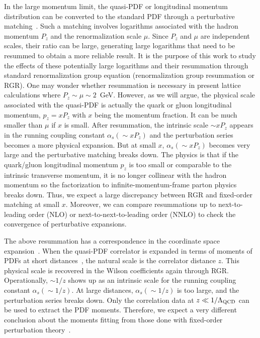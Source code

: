 \documentclass[prd,aps,twocolumn,preprintnumbers, showpacs, nofootinbib,superscriptaddress,notitlepage]{revtex4-2}
\begin{document}
In the large momentum limit, the quasi-PDF or longitudinal momentum distribution can be converted to the standard PDF through a perturbative matching~\cite{Ji:2020ect}. Such a matching involves logarithms associated with the hadron momentum $P_z$ and the renormalization scale $\mu$. Since $P_z$ and $\mu$ are independent scales, their ratio can be large, generating large logarithms that need to be resummed to obtain a more reliable result. It is the purpose of this work to study the effects of these potentially large logarithms and their resummation through standard renormalization group equation (renormalization group resummation or RGR). One may wonder whether resummation is necessary in present lattice calculations where $P_z\sim \mu\sim 2$~GeV. However, as we will argue, the physical scale associated with the quasi-PDF is actually the quark
or gluon longitudinal momentum, $p_z=xP_z$ with $x$ being the momentum fraction. 
It can be much smaller than $\mu$ if $x$ is small. After resummation, the intrinsic scale 
$\sim x P_z$ appears in the running coupling constant $\alpha_s(\sim x P_z)$ and the 
perturbation series becomes a more physical expansion. 
But at small $x$, $\alpha_s(\sim x P_z)$ becomes very large and the perturbative matching breaks down. The physics is that if the quark/gluon longitudinal momentum $p_z$ is too small or comparable
to the intrinsic transverse momentum, it is no longer collinear with the hadron momentum so the factorization to infinite-momentum-frame parton physics breaks down. Thus, we expect a large discrepancy between RGR and fixed-order matching at small $x$. 
Moreover, we can compare resummations up to next-to-leading order (NLO) or next-to-next-to-leading order (NNLO) to check the convergence of perturbative expansions.

The above resummation has a correspondence in the coordinate space expansion~\cite{Braun:2007wv}. When
the quasi-PDF correlator is expanded in terms of moments of PDFs at short distances~\cite{Radyushkin:2017cyf,Ma:2017pxb,Izubuchi:2018srq}, the natural scale is the correlator distance $z$. This physical scale is recovered in the Wilson coefficients again through RGR. 
Operationally, $\sim 1/z$ shows up as an intrinsic scale for the running coupling constant $\alpha_s(\sim1/z)$. At large distances, $\alpha_s(\sim1/z)$ is too large, and the perturbation series breaks down. Only the correlation data at $z\ll 1/\Lambda_{\rm QCD}$ can be used
to extract the PDF moments. Therefore, we expect a very different conclusion 
about the moments fitting from those done with fixed-order perturbation theory~\cite{Radyushkin:2018cvn,Gao:2020ito}. 
\end{document}

